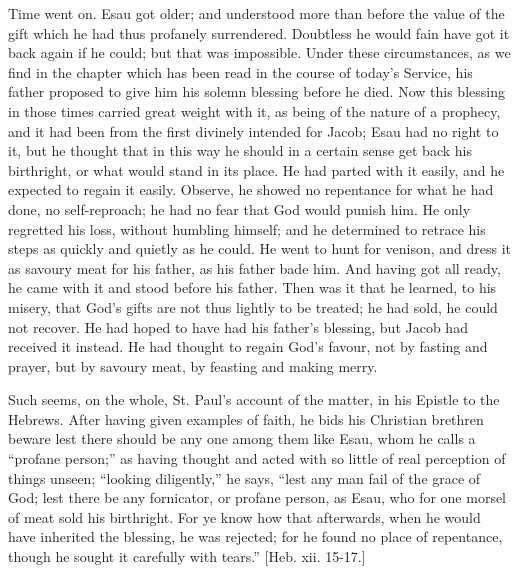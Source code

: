 Time went on. Esau got older; and understood more than before the
value of the gift which he had thus profanely surrendered. Doubtless he
would fain have got it back again if he could; but that was impossible.
Under these circumstances, as we find in the chapter which has been read
in the course of today's Service, his father proposed to give him his
solemn blessing before he died. Now this blessing in those times carried
great weight with it, as being of the nature of a prophecy, and it had
been from the first divinely intended for Jacob; Esau had no right to
it, but he thought that in this way he should in a certain sense get
back his birthright, or what would stand in its place. He had parted
with it easily, and he expected to regain it easily. Observe, he showed
no repentance for what he had done, no self-reproach; he had no fear
that God would punish him. He only regretted his loss, without humbling
himself; and he determined to retrace his steps as quickly and quietly
as he could. He went to hunt for venison, and dress it as savoury meat
for his father, as his father bade him. And having got all ready, he
came with it and stood before his father. Then was it that he learned,
to his misery, that God's gifts are not thus lightly to be treated; he
had sold, he could not recover. He had hoped to have had his father's
blessing, but Jacob had received it instead. He had thought to regain
God's favour, not by fasting and prayer, but by savoury meat, by
feasting and making merry.

Such seems, on the whole, St. Paul's account of the matter, in his
Epistle to the Hebrews. After having given examples of faith, he bids
his Christian brethren beware lest there should be any one among them
like Esau, whom he calls a ``profane person;'' as having thought
and acted with so little of real perception of things unseen;
``looking diligently,'' he says, ``lest any man fail of the
grace of God; lest there be any fornicator, or profane person, as Esau,
who for one morsel of meat sold his birthright. For ye know how that
afterwards, when he would have inherited the blessing, he was rejected;
for he found no place of repentance, though he sought it carefully with
tears.'' [Heb. xii. 15-17.]

